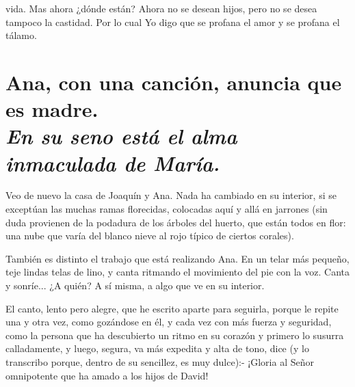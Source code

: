 \documentclass[12pt, twoside, openright]{book} %
\begin{document}
vida. Mas ahora ¿dónde están? Ahora no se desean hijos, pero no se desea tampoco la castidad. Por lo cual Yo digo que se profana el amor y se profana el tálamo. 

\chapter*{Ana, con una canción, anuncia que es madre. \\ \normalfont\normalsize\textit{En su seno está el alma inmaculada de María.}}
 
Veo de nuevo la casa de Joaquín y Ana. Nada ha cambiado en su interior, si se exceptúan las muchas ramas florecidas, colocadas aquí y allá en jarrones (sin duda provienen de la podadura de los árboles del huerto, que están todos en flor: una nube que varía del blanco nieve al rojo típico de ciertos corales). 

También es distinto el trabajo que está realizando Ana. En un telar más pequeño, teje lindas telas de lino, y canta ritmando el movimiento del pie con la voz. Canta y sonríe... ¿A quién? A sí misma, a algo que ve en su interior. 

El canto, lento pero alegre, que he escrito aparte para seguirla, porque le repite una y otra vez, como gozándose en él, y cada vez con más fuerza y seguridad, como la persona que ha descubierto un ritmo en su corazón y primero lo susurra calladamente, y luego, segura, va más expedita y alta de tono, dice (y lo transcribo porque, dentro de su sencillez, es muy dulce):- ¡Gloria al Señor omnipotente que ha amado a los hijos de David! 
\end{document}
